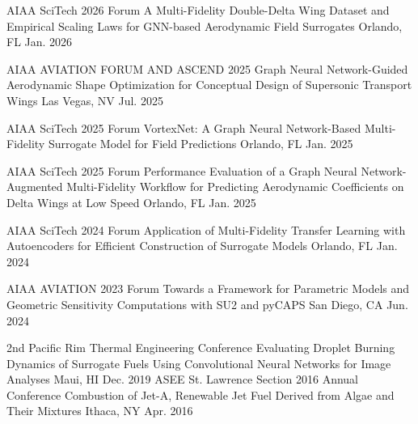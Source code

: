 
\begin{cventries}


\cvsmallentries
    {AIAA SciTech 2026 Forum} %
    {A Multi-Fidelity Double-Delta Wing Dataset and Empirical Scaling Laws for GNN-based Aerodynamic Field Surrogates} %
    {Orlando, FL} %
    {Jan. 2026} %
    {
    }
    
\cvsmallentries
    {AIAA AVIATION FORUM AND ASCEND 2025} %
    {Graph Neural Network-Guided Aerodynamic Shape Optimization for Conceptual Design of Supersonic Transport Wings} %
    {Las Vegas, NV} %
    {Jul. 2025} %
    {
    }

\cvsmallentries
    {AIAA SciTech 2025 Forum} %
    {VortexNet: A Graph Neural Network-Based Multi-Fidelity Surrogate Model for Field Predictions} %
    {Orlando, FL} %
    {Jan. 2025} %
    {
    }


\cvsmallentries
    {AIAA SciTech 2025 Forum} %
    {Performance Evaluation of a Graph Neural Network-Augmented Multi-Fidelity Workflow for Predicting Aerodynamic Coefficients on Delta Wings at Low Speed} %
    {Orlando, FL} %
    {Jan. 2025} %
    {
    }

\cvsmallentries
    {AIAA SciTech 2024 Forum} %
    {Application of Multi-Fidelity Transfer Learning with Autoencoders for Efficient Construction of Surrogate Models} %
    {Orlando, FL} %
    {Jan. 2024} %
    {
    }

\cvsmallentries
    {AIAA AVIATION 2023 Forum} %
    {Towards a Framework for Parametric Models and Geometric Sensitivity Computations with SU2 and pyCAPS} %
    {San Diego, CA} %
    {Jun. 2024} %
    {
    }

\cvsmallentries
    {2nd Pacific Rim Thermal Engineering Conference} %
    {Evaluating Droplet Burning Dynamics of Surrogate Fuels Using Convolutional Neural Networks for Image Analyses} %
    {Maui, HI} %
    {Dec. 2019} %
    {
    }
\cvsmallentries
    {ASEE St. Lawrence Section 2016 Annual Conference} %
    {Combustion of Jet-A, Renewable Jet Fuel Derived from Algae and Their Mixtures} %
    {Ithaca, NY} %
    {Apr. 2016} %
    {
    }
\end{cventries}
